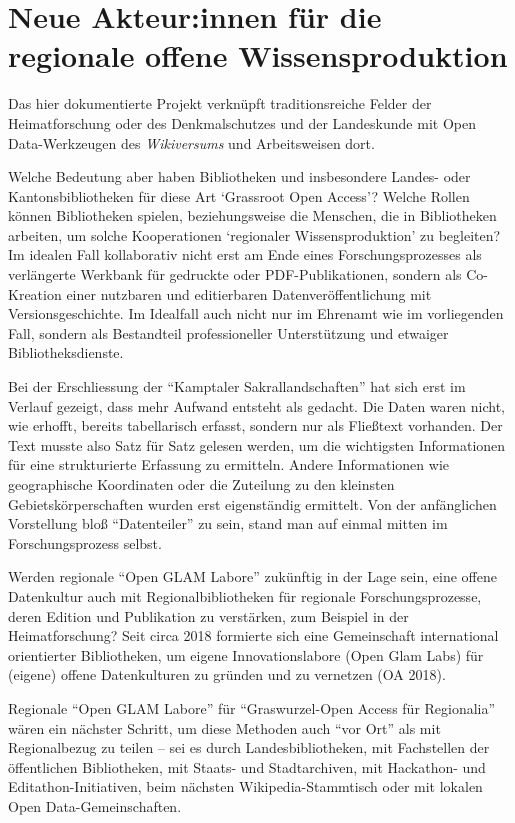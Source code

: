\documentclass[a4paper,
fontsize=11pt,
oneside,
numbers=noperiodatend,
parskip=half-,
bibliography=totoc,
final
]{scrartcl}
\begin{document}
\hypertarget{neue-akteurinnen-fuxfcr-die-regionale-offene-wissensproduktion}{%
\section{Neue Akteur:innen für die regionale offene
Wissensproduktion}\label{neue-akteurinnen-fuxfcr-die-regionale-offene-wissensproduktion}}

Das hier dokumentierte Projekt verknüpft traditionsreiche Felder der
Heimatforschung oder des Denkmalschutzes und der Landeskunde mit Open
Data-Werkzeugen des \emph{Wikiversums} und Arbeitsweisen dort.

Welche Bedeutung aber haben Bibliotheken und insbesondere Landes- oder
Kantonsbibliotheken für diese Art \enquote*{Grassroot Open Access}?
Welche Rollen können Bibliotheken spielen, beziehungsweise die Menschen,
die in Bibliotheken arbeiten, um solche Kooperationen
\enquote*{regionaler Wissensproduktion} zu begleiten? Im idealen Fall
kollaborativ nicht erst am Ende eines Forschungsprozesses als
verlängerte Werkbank für gedruckte oder PDF-Publikationen, sondern als
Co-Kreation einer nutzbaren und editierbaren Datenveröffentlichung mit
Versionsgeschichte. Im Idealfall auch nicht nur im Ehrenamt wie im
vorliegenden Fall, sondern als Bestandteil professioneller Unterstützung
und etwaiger Bibliotheksdienste.

Bei der Erschliessung der \enquote{Kamptaler Sakrallandschaften} hat
sich erst im Verlauf gezeigt, dass mehr Aufwand entsteht als gedacht.
Die Daten waren nicht, wie erhofft, bereits tabellarisch erfasst,
sondern nur als Fließtext vorhanden. Der Text musste also Satz für Satz
gelesen werden, um die wichtigsten Informationen für eine strukturierte
Erfassung zu ermitteln. Andere Informationen wie geographische
Koordinaten oder die Zuteilung zu den kleinsten Gebietskörperschaften
wurden erst eigenständig ermittelt. Von der anfänglichen Vorstellung
bloß \enquote{Datenteiler} zu sein, stand man auf einmal mitten im
Forschungsprozess selbst.

Werden regionale \enquote{Open GLAM Labore} zukünftig in der Lage sein,
eine offene Datenkultur auch mit Regionalbibliotheken für regionale
Forschungsprozesse, deren Edition und Publikation zu verstärken, zum
Beispiel in der Heimatforschung? Seit circa 2018 formierte sich eine
Gemeinschaft international orientierter Bibliotheken, um eigene
Innovationslabore (Open Glam Labs) für (eigene) offene Datenkulturen zu
gründen und zu vernetzen (OA 2018).

Regionale \enquote{Open GLAM Labore} für \enquote{Graswurzel-Open Access
für Regionalia} wären ein nächster Schritt, um diese Methoden auch
\enquote{vor Ort} als mit Regionalbezug zu teilen -- sei es durch
Landesbibliotheken, mit Fachstellen der öffentlichen Bibliotheken, mit
Staats- und Stadtarchiven, mit Hackathon- und Editathon-Initiativen,
beim nächsten Wikipedia-Stammtisch oder mit lokalen Open
Data-Gemeinschaften.
\end{document}
